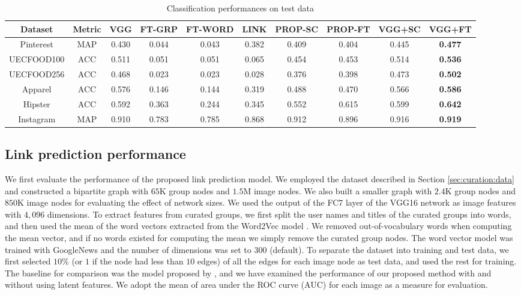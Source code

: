 \documentclass[letterpaper]{article} %
\begin{document}
\begin{table*}[t]
  \caption{Classification performances on test data}
  \label{table:classify}
  \begin{center}
    \begin{tabular}{|c|c|c|c|c|c||c|c|c|c|}\hline
      Dataset    & Metric & VGG   & FT-GRP & FT-WORD & LINK  & PROP-SC & PROP-FT & VGG+SC & VGG+FT \\ \hline
	  Pinterest  & MAP    & 0.430 & 0.044  & 0.043   & 0.382 & 0.409   & 0.404   & 0.445  & {\bf 0.477}  \\
      UECFOOD100 & ACC    & 0.511 & 0.051  & 0.051   & 0.065 & 0.454   & 0.453   & 0.514  & {\bf 0.536}  \\
      UECFOOD256 & ACC    & 0.468 & 0.023  & 0.023   & 0.028 & 0.376   & 0.398   & 0.473  & {\bf 0.502}  \\
      Apparel    & ACC    & 0.576 & 0.146  & 0.144   & 0.319 & 0.488   & 0.470   & 0.566  & {\bf 0.586}  \\
	  Hipster    & ACC    & 0.592 & 0.363  & 0.244   & 0.345 & 0.552   & 0.615   & 0.599  & {\bf 0.642}  \\
	  Instagram  & MAP    & 0.910 & 0.783  & 0.785   & 0.868 & 0.912   & 0.896   & 0.916  & {\bf 0.919}  \\ \hline
    \end{tabular}
  \end{center}
\end{table*}

\subsection{Link prediction performance}
\label{sec:exp:link}
\indent

We first evaluate the performance of the proposed link prediction model.
We employed  the dataset described in Section \ref{sec:curation:data} and constructed a bipartite graph with $65$K group nodes and $1.5$M image nodes.
We also built a smaller graph with $2.4$K group nodes and $850$K image nodes for evaluating the effect of network sizes.
We used the output of the FC7 layer of the VGG16 network as image features with $4,096$ dimensions.
To extract features from curated groups, we first split the user names and titles of the curated groups into words, and then used the mean of the word vectors extracted from the Word2Vec model \cite{Mikolov2013}.
We removed out-of-vocabulary words when computing the mean vector, and if no words existed for computing the mean we simply remove the curated group nodes.
The word vector model was trained with GoogleNews and the number of dimensions was set to 300 (default).
To separate the dataset into training and test data, we first selected $10$\% (or $1$ if the node had less than $10$ edges) of all the edges for each image node as test data, and used the rest for training.
The baseline for comparison was the model proposed by \cite{Menon2011}, and we have examined the performance of our proposed method with and without using latent features.
We adopt the mean of area under the ROC curve (AUC) for each image as a measure for evaluation.
\end{document}
